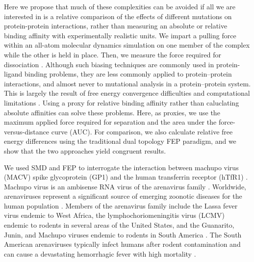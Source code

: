\documentclass[12pt]{article}
\begin{document}
Here we propose that much of these complexities can be avoided if all we are interested in is a relative comparison of the effects of different mutations on protein-protein interactions, rather than measuring an absolute or relative binding affinity with experimentally realistic units. We impart a pulling force within an all-atom molecular dynamics simulation on one member of the complex while the other is held in place. Then, we measure the force required for dissociation \citep{Lu1999,Is2001A,Is2001B,Park2004,Gumbart2012,Minoetal2013}. Although such biasing techniques are commonly used in protein-ligand binding problems, they are less commonly applied to protein--protein interactions, and almost never to mutational analysis in a protein--protein system. This is largely the result of free energy convergence difficulties and computational limitations \citep{Cuendet2008,Cuendet2011}. Using a proxy for relative binding affinity rather than caluclating absolute affinities can solve these problems. Here, as proxies, we use the maximum applied force required for separation and the area under the force-versus-distance curve (AUC). For comparison, we also calculate relative free energy differences using the traditional dual topology FEP paradigm, and we show that the two approaches yield congruent results.

We used SMD and FEP to interrogate the interaction between machupo virus (MACV) spike glycoprotein (GP1) and the human transferrin receptor (hTfR1) \citep{Abraham2010,Charrel2003}. Machupo virus is an ambisense RNA virus of the arenavirus family \citep{Charrel2003}. Worldwide, arenaviruses represent a significant source of emerging zoonotic diseases for the human population \citep{Charrel2003}. Members of the arenavirus family include the Lassa fever virus endemic to West Africa, the lymphochoriomeningitis virus (LCMV) endemic to rodents in several areas of the United States, and the Guanarito, Junin, and Machupo viruses endemic to rodents in South America \citep{Charrel2003}. The South American arenaviruses typically infect humans after rodent contamination and can cause a devastating hemorrhagic fever with high mortality \citep{Charrel2003}.
\end{document}

